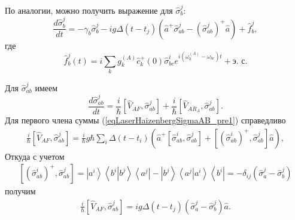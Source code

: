По аналогии, можно получить выражение для $\hat{\sigma}_b^j$:
\begin{equation}
\frac{d \hat{\sigma}_b^j}{d t} = 
- \gamma_{b} \hat{\sigma}_{b}^{j} -
i g 
\Delta\left(t - t_j\right) 
 \left(
\hat{a}^{+}\hat{\sigma}^{j}_{ab} -
\left(\hat{\sigma}^{j}_{ab}\right)^{+}\hat{a}
\right) + \hat{f}_{b}^{j},
\label{eqLaserHaizenbergSigmaBJ}
\end{equation}
где
\begin{equation}
\hat{f}_{b}^{j}\left(t\right) = i
\sum_{k}
g_k^{(A)}
\hat{c}_k^{+}\left(0\right)\hat{\sigma}^{i}_{bc}  
e^{i\left(\omega_k^{(A)} - \omega_{bc}\right)t} + \mbox{э. с.}
\label{eqLaserHaizenbergFBJ}
\end{equation}

Для $\hat{\sigma}^{j}_{ab}$ имеем
\begin{equation}
\frac{d \hat{\sigma}_{ab}^j}{d t} = 
\frac{i}{\hbar}
\left[\hat{V}_{AF}, \hat{\sigma}_{ab}^j\right] + 
\frac{i}{\hbar}
\left[\hat{V}_{AR_A}, \hat{\sigma}_{ab}^j\right].
\label{eqLaserHaizenbergSigmaAB_pre1}
\end{equation}
Для первого члена суммы (\ref{eqLaserHaizenbergSigmaAB_pre1}) справедливо
\begin{eqnarray}
\frac{i}{\hbar}
\left[\hat{V}_{AF}, \hat{\sigma}_{ab}^j\right] = 
 \frac{i}{\hbar} g \hbar
\sum_i
\Delta\left(t - t_i\right) 
 \left(
\hat{a}^{+}\left[\hat{\sigma}^{i}_{ab},\hat{\sigma}_{ab}^j\right]  +
\left[\left(\hat{\sigma}^{i}_{ab}\right)^{+},\hat{\sigma}_{ab}^j\right]
\hat{a}
\right),
\nonumber
\end{eqnarray}
Откуда с учетом 
\begin{eqnarray}
\left[\left(\hat{\sigma}^{i}_{ab}\right)^{+},\hat{\sigma}_{ab}^j\right] = 
\left|a^i\right>\left<b^i\right|\left.b^j\right>\left<a^j\right| -
\left|b^j\right>\left<a^j\right|\left.a^i\right>\left<b^i\right| = 
- \delta_{ij}\left(\hat{\sigma}^{j}_{a} - \hat{\sigma}^{j}_{b}\right)
\nonumber
\end{eqnarray}
получим
\begin{eqnarray}
\frac{i}{\hbar}
\left[\hat{V}_{AF}, \hat{\sigma}_{ab}^j\right] = 
i g 
\Delta\left(t - t_j\right) 
\left(\hat{\sigma}^{j}_{a} -
\hat{\sigma}^{j}_{b}\right)\hat{a}.
\label{eqLaserHaizenbergSigmaAB_pre1_1}
\end{eqnarray}

